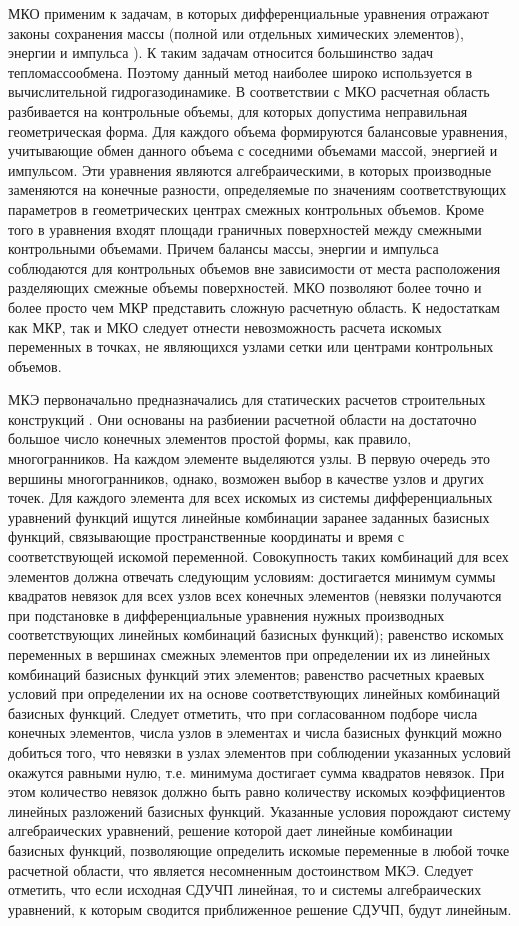 \documentclass[a4paper,12pt]{article}
\begin{document}
МКО применим к задачам, в которых дифференциальные уравнения отражают
законы сохранения массы (полной или отдельных химических элементов),
энергии и импульса \cite{C2020,KD2018,PS1968}). К таким задачам
относится большинство задач тепломассообмена.  Поэтому данный метод
наиболее широко используется в вычислительной гидрогазодинамике. В
соответствии с МКО расчетная область разбивается на контрольные
объемы, для которых допустима неправильная геометрическая форма.  Для
каждого объема формируются балансовые уравнения, учитывающие обмен
данного объема с соседними объемами массой, энергией и импульсом. Эти
уравнения являются алгебраическими, в которых производные заменяются
на конечные разности, определяемые по значениям соответствующих
параметров в геометрических центрах смежных контрольных объемов. Кроме
того в уравнения входят площади граничных поверхностей между смежными
контрольными объемами. Причем балансы массы, энергии и импульса
соблюдаются для контрольных объемов вне зависимости от места
расположения разделяющих смежные объемы поверхностей. МКО позволяют
более точно и более просто чем МКР представить сложную расчетную
область.  К недостаткам как МКР, так и МКО следует отнести
невозможность расчета искомых переменных в точках, не являющихся
узлами сетки или центрами контрольных объемов.

МКЭ первоначально предназначались для статических расчетов
строительных конструкций \cite{CTO2018,ZTZ2005,EGH2000}. Они основаны
на разбиении расчетной области на достаточно большое число конечных
элементов простой формы, как правило, многогранников.  На каждом
элементе выделяются узлы. В первую очередь это вершины многогранников,
однако, возможен выбор в качестве узлов и других точек. Для каждого
элемента для всех искомых из системы дифференциальных уравнений
функций ищутся линейные комбинации заранее заданных базисных функций,
связывающие пространственные координаты и время с соответствующей
искомой переменной. Совокупность таких комбинаций для всех элементов
должна отвечать следующим условиям: достигается минимум суммы
квадратов невязок для всех узлов всех конечных элементов (невязки
получаются при подстановке в дифференциальные уравнения нужных
производных соответствующих линейных комбинаций базисных функций);
равенство искомых переменных в вершинах смежных элементов при
определении их из линейных комбинаций базисных функций этих элементов;
равенство расчетных краевых условий при определении их на основе
соответствующих линейных комбинаций базисных функций. Следует
отметить, что при согласованном подборе числа конечных элементов,
числа узлов в элементах и числа базисных функций можно добиться того,
что невязки в узлах элементов при соблюдении указанных условий
окажутся равными нулю, т.е. минимума достигает сумма квадратов
невязок.  При этом количество невязок должно быть равно количеству
искомых коэффициентов линейных разложений базисных функций.  Указанные
условия порождают систему алгебраических уравнений, решение которой
дает линейные комбинации базисных функций, позволяющие определить
искомые переменные в любой точке расчетной области, что является
несомненным достоинством МКЭ. Следует отметить, что если исходная
СДУЧП линейная, то и системы алгебраических уравнений, к которым
сводится приближенное решение СДУЧП, будут линейным.
\end{document}
